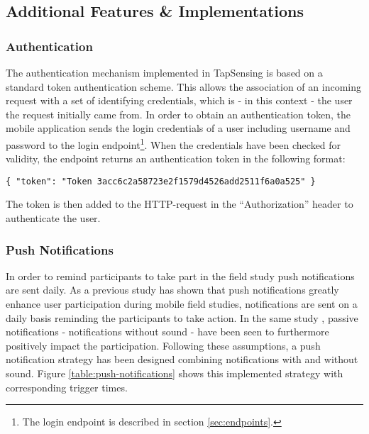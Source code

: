 \subsection{Additional Features \& Implementations}
\subsubsection{Authentication}
The authentication mechanism implemented in TapSensing is based on a standard token authentication scheme. This allows the association of an incoming request with a set of identifying credentials, which is - in this context - the user the request initially came from. In order to obtain an authentication token, the mobile application sends the login credentials of a user including username and password to the login endpoint\footnote{The login endpoint is described in section \ref{sec:endpoints}.}. When the credentials have been checked for validity, the endpoint returns an authentication token in the following format:
\begin{verbatim}
{ "token": "Token 3acc6c2a58723e2f1579d4526add2511f6a0a525" }
\end{verbatim}
The token is then added to the HTTP-request in the ``Authorization'' header to authenticate the user.

\subsubsection{Push Notifications}
In order to remind participants to take part in the field study push notifications are sent daily. As a previous study has shown that push notifications greatly enhance user participation \cite{pushNot} during mobile field studies, notifications are sent on a daily basis reminding the participants to take action. In the same study \cite{pushNot}, passive notifications - notifications without sound - have been seen to furthermore positively impact the participation. 
Following these assumptions, a push notification strategy has been designed combining notifications with and without sound. Figure \ref{table:push-notifications} shows this implemented strategy with corresponding trigger times.

